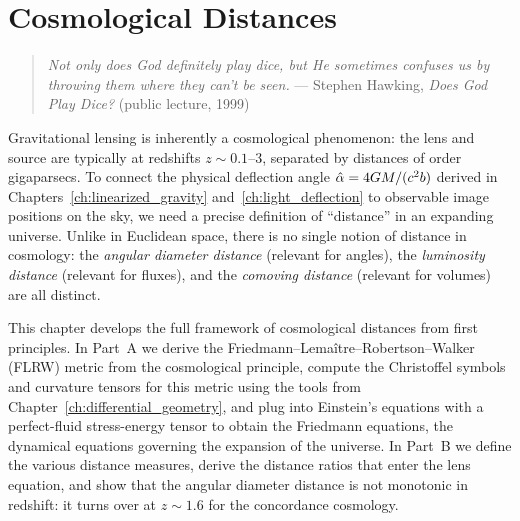 
\chapter{Cosmological Distances}
\label{ch:cosmological_distances}

\begin{quote}
\textit{Not only does God definitely play dice, but He sometimes confuses us by
throwing them where they can't be seen.}
\hfill --- Stephen Hawking, \textit{Does God Play Dice?} (public lecture, 1999)
\end{quote}

\noindent
Gravitational lensing is inherently a cosmological phenomenon: the lens
and source are typically at redshifts $z \sim 0.1$--$3$, separated by
distances of order gigaparsecs.  To connect the physical deflection angle
$\hat{\alpha} = 4G M / (c^2 b)$ derived in Chapters~\ref{ch:linearized_gravity}
and~\ref{ch:light_deflection} to observable image positions on the sky, we need a precise
definition of ``distance'' in an expanding universe.  Unlike in Euclidean
space, there is no single notion of distance in cosmology: the
\textit{angular diameter distance} (relevant for angles), the
\textit{luminosity distance} (relevant for fluxes), and the
\textit{comoving distance} (relevant for volumes) are all distinct.

This chapter develops the full framework of cosmological distances from
first principles.  In Part~A we derive the Friedmann--Lema\^{i}tre--Robertson--Walker (FLRW)
metric from the cosmological principle, compute the Christoffel symbols
and curvature tensors for this metric using the tools from Chapter~\ref{ch:differential_geometry},
and plug into Einstein's equations with a perfect-fluid
stress-energy tensor to obtain the Friedmann equations, the dynamical
equations governing the expansion of the universe.  In
Part~B we define the various distance measures, derive the distance
ratios that enter the lens equation, and show that the angular diameter
distance is not monotonic in redshift: it turns
over at $z \sim 1.6$ for the concordance cosmology.

